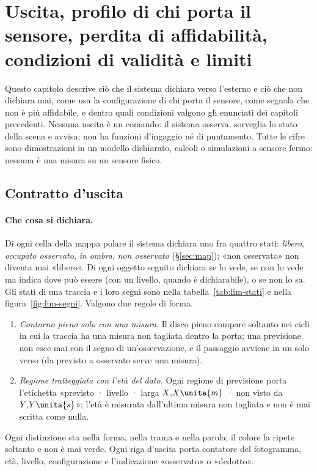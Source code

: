 \section{Uscita, profilo di chi porta il sensore, perdita di affidabilità, condizioni di validità e limiti}\label{sec:lim}

Questo capitolo descrive ciò che il sistema dichiara verso l'esterno e ciò che non dichiara mai, come usa la configurazione di chi porta il sensore, come segnala che non è più affidabile, e dentro quali condizioni valgono gli enunciati dei capitoli precedenti. Nessuna uscita è un comando: il sistema osserva, sorveglia lo stato della scena e avvisa; non ha funzioni d'ingaggio né di puntamento. Tutte le cifre sono dimostrazioni in un modello dichiarato, calcoli o simulazioni a sensore fermo: nessuna è una misura su un sensore fisico.

\subsection{Contratto d'uscita}\label{sec:lim-uscita}

\paragraph{Che cosa si dichiara.} Di ogni cella della mappa polare il sistema dichiara uno fra quattro stati: \emph{libero}, \emph{occupato osservato}, \emph{in ombra}, \emph{non osservato} (\S\ref{sec:map}); «non osservato» non diventa mai «libero». Di ogni oggetto seguito dichiara se lo vede, se non lo vede ma indica dove può essere (con un livello, quando è dichiarabile), o se non lo sa. Gli stati di una traccia e i loro segni sono nella tabella~\ref{tab:lim-stati} e nella figura~\ref{fig:lim-segni}. Valgono due regole di forma.
\begin{enumerate}[label=(\alph*)]
\item \emph{Contorno pieno solo con una misura.} Il disco pieno compare soltanto nei cicli in cui la traccia ha una misura non tagliata dentro la porta; una previsione non esce mai con il segno di un'osservazione, e il passaggio avviene in un solo verso (da previsto a osservato serve una misura).
\item \emph{Regione tratteggiata con l'età del dato.} Ogni regione di previsione porta l'etichetta «previsto · livello · larga $X{,}X\unita{m}$ · non visto da $Y{,}Y\unita{s}$»; l'età è misurata dall'ultima misura non tagliata e non è mai scritta come nulla.
\end{enumerate}
Ogni distinzione sta nella forma, nella trama e nella parola; il colore la ripete soltanto e non è mai verde. Ogni riga d'uscita porta contatore del fotogramma, età, livello, configurazione e l'indicazione «osservato» o «dedotto».


